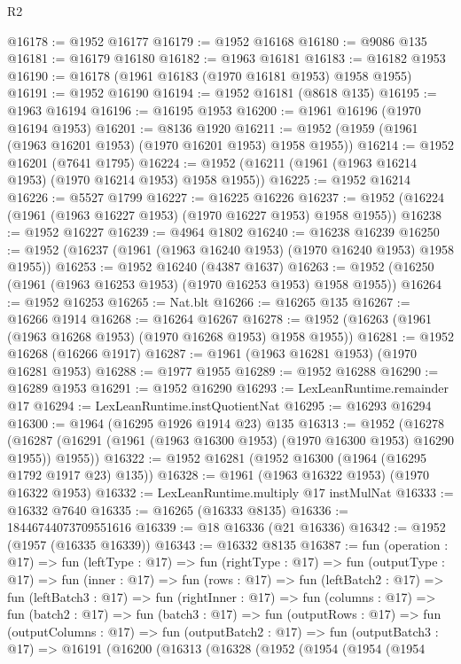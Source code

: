 \begin{lexlean}{R2}
\begin{coremodule}
@16178 := @1952 @16177
@16179 := @1952 @16168
@16180 := @9086 @135
@16181 := @16179 @16180
@16182 := @1963 @16181
@16183 := @16182 @1953
@16190 := @16178 (@1961 @16183 (@1970 @16181 @1953) @1958 @1955)
@16191 := @1952 @16190
@16194 := @1952 @16181 (@8618 @135)
@16195 := @1963 @16194
@16196 := @16195 @1953
@16200 := @1961 @16196 (@1970 @16194 @1953)
@16201 := @8136 @1920
@16211 := @1952 (@1959 (@1961 (@1963 @16201 @1953) (@1970 @16201 @1953) @1958 @1955))
@16214 := @1952 @16201 (@7641 @1795)
@16224 := @1952 (@16211 (@1961 (@1963 @16214 @1953) (@1970 @16214 @1953) @1958 @1955))
@16225 := @1952 @16214
@16226 := @5527 @1799
@16227 := @16225 @16226
@16237 := @1952 (@16224 (@1961 (@1963 @16227 @1953) (@1970 @16227 @1953) @1958 @1955))
@16238 := @1952 @16227
@16239 := @4964 @1802
@16240 := @16238 @16239
@16250 := @1952 (@16237 (@1961 (@1963 @16240 @1953) (@1970 @16240 @1953) @1958 @1955))
@16253 := @1952 @16240 (@4387 @1637)
@16263 := @1952 (@16250 (@1961 (@1963 @16253 @1953) (@1970 @16253 @1953) @1958 @1955))
@16264 := @1952 @16253
@16265 := Nat.blt
@16266 := @16265 @135
@16267 := @16266 @1914
@16268 := @16264 @16267
@16278 := @1952 (@16263 (@1961 (@1963 @16268 @1953) (@1970 @16268 @1953) @1958 @1955))
@16281 := @1952 @16268 (@16266 @1917)
@16287 := @1961 (@1963 @16281 @1953) (@1970 @16281 @1953)
@16288 := @1977 @1955
@16289 := @1952 @16288
@16290 := @16289 @1953
@16291 := @1952 @16290
@16293 := LexLeanRuntime.remainder @17
@16294 := LexLeanRuntime.instQuotientNat
@16295 := @16293 @16294
@16300 := @1964 (@16295 @1926 @1914 @23) @135
@16313 := @1952
    (@16278 (@16287 (@16291 (@1961 (@1963 @16300 @1953) (@1970 @16300 @1953) @16290 @1955)) @1955))
@16322 := @1952 @16281 (@1952 @16300 (@1964 (@16295 @1792 @1917 @23) @135))
@16328 := @1961 (@1963 @16322 @1953) (@1970 @16322 @1953)
@16332 := LexLeanRuntime.multiply @17 instMulNat
@16333 := @16332 @7640
@16335 := @16265 (@16333 @8135)
@16336 := 18446744073709551616
@16339 := @18 @16336 (@21 @16336)
@16342 := @1952 (@1957 (@16335 @16339))
@16343 := @16332 @8135
@16387 := fun (operation : @17) =>
  fun (leftType : @17) =>
  fun (rightType : @17) =>
  fun (outputType : @17) =>
  fun (inner : @17) =>
  fun (rows : @17) =>
  fun (leftBatch2 : @17) =>
  fun (leftBatch3 : @17) =>
  fun (rightInner : @17) =>
  fun (columns : @17) =>
  fun (batch2 : @17) =>
  fun (batch3 : @17) =>
  fun (outputRows : @17) =>
  fun (outputColumns : @17) =>
  fun (outputBatch2 : @17) =>
  fun (outputBatch3 : @17) =>
  @16191
    (@16200
      (@16313
        (@16328
          (@1952
            (@1954
              (@1954
                (@1954

\end{coremodule}
\end{lexlean}
